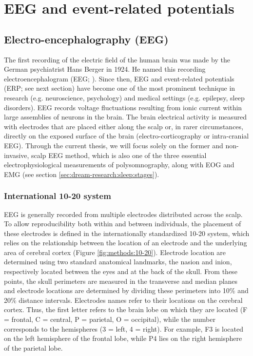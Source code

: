 \cleardoublepage

\chapter{EEG and event-related potentials}
\label{sec:eeg}

\section{Electro-encephalography (EEG)}
\label{sec:eeg:eeg}

The first recording of the electric field of the human brain was made by the German psychiatrist Hans Berger in 1924. He named this recording electroencephalogram (EEG; \citealp{berger_uber_1929}). Since then, EEG and event-related potentials (ERP; see next section) have become one of the most prominent technique in research (e.g. neuroscience, psychology) and medical settings (e.g. epilepsy, sleep disorders). EEG records voltage fluctuations resulting from ionic current within large assemblies of neurons in the brain. The brain electrical activity is measured with electrodes that are placed either along the scalp or, in rarer circumstances, directly on the exposed surface of the brain (electro-corticography or intra-cranial EEG). Through the current thesis, we will focus solely on the former and non-invasive, scalp EEG method, which is also one of the three essential electrophysiological measurements of polysomnography, along with EOG and EMG (see section \ref{sec:dream-research:sleep:stages}).

\subsection{International 10-20 system}
\label{sec:eeg:eeg:10-20}

EEG is generally recorded from multiple electrodes distributed across the scalp. To allow reproducibility both within and between individuals, the placement of these electrodes is defined in the internationally standardized 10-20 system, which relies on the relationship between the location of an electrode and the underlying area of cerebral cortex (Figure \ref{fig:methods:10-20}). Electrode location are determined using two standard anatomical landmarks, the nasion and inion, respectively located between the eyes and at the back of the skull. From these points, the skull perimeters are measured in the transverse and median planes and electrode locations are determined by dividing these perimeters into 10\% and 20\% distance intervals. Electrodes names refer to their locations on the cerebral cortex. Thus, the first letter refers to the brain lobe on which they are located (F = frontal, C = central, P = parietal, O = occipital), while the number corresponds to the hemispheres (3 = left, 4 = right). For example, F3 is located on the left hemisphere of the frontal lobe, while P4 lies on the right hemisphere of the parietal lobe.

